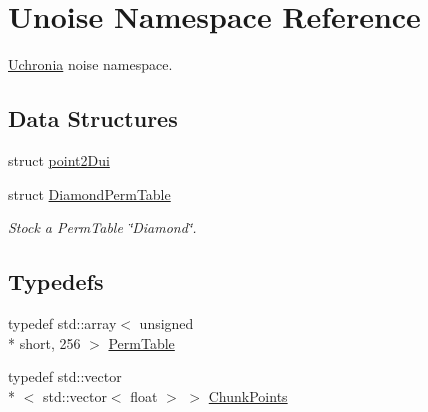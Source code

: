 \hypertarget{namespace_unoise}{\section{Unoise Namespace Reference}
\label{namespace_unoise}
}


\hyperlink{namespace_uchronia}{Uchronia} noise namespace.  


\subsection*{Data Structures}
\begin{DoxyCompactItemize}
\item 
struct \hyperlink{struct_unoise_1_1point2_dui}{point2\-Dui}
\item 
struct \hyperlink{struct_unoise_1_1_diamond_perm_table}{Diamond\-Perm\-Table}
\begin{DoxyCompactList}\small\item\em Stock a Perm\-Table \char`\"{}\-Diamond\char`\"{}. \end{DoxyCompactList}\end{DoxyCompactItemize}
\subsection*{Typedefs}
\begin{DoxyCompactItemize}
\item 
typedef std\-::array$<$ unsigned \\*
short, 256 $>$ \hyperlink{namespace_unoise_ae11142038f2dd1bea2711b2b99bbfaf6}{Perm\-Table}
\item 
typedef std\-::vector\\*
$<$ std\-::vector$<$ float $>$ $>$ \hyperlink{namespace_unoise_ac1e5c6227ab68e4e8c1ad57fdbddf51b}{Chunk\-Points}
\end{DoxyCompactItemize}
